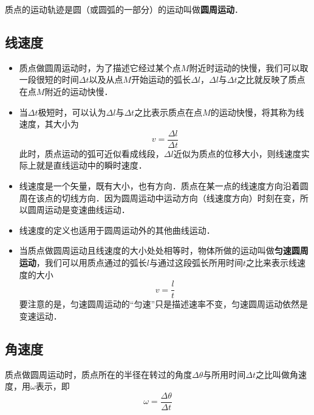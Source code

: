 
质点的运动轨迹是圆（或圆弧的一部分）的运动叫做\textbf{圆周运动}．

\subsection{线速度}

\begin{itemize}
\item 质点做圆周运动时，为了描述它经过某个点$M$附近时运动的快慢，我们可以取一段很短的时间$\Delta t$以及从点$M$开始运动的弧长$\Delta l$，$\Delta l$与$\Delta t$之比就反映了质点在点$M$附近的运动快慢．

\item 当$\Delta t$极短时，可以认为$\Delta l$与$\Delta t$之比表示质点在点$M$的运动快慢，将其称为线速度，其大小为
\begin{equation}
v=\frac{\Delta l}{\Delta t}
\end{equation}
此时，质点运动的弧可近似看成线段，$\Delta l$近似为质点的位移大小，则线速度实际上就是直线运动中的瞬时速度．

\item 线速度是一个矢量，既有大小，也有方向．质点在某一点的线速度方向沿着圆周在该点的切线方向．因为圆周运动中运动方向（线速度方向）时刻在变，所以圆周运动是变速曲线运动．

\item 线速度的定义也适用于圆周运动外的其他曲线运动．

\item 当质点做圆周运动且线速度的大小处处相等时，物体所做的运动叫做\textbf{匀速圆周运动}，我们可以用质点通过的弧长$l$与通过这段弧长所用时间$t$之比来表示线速度的大小
\begin{equation}
v=\frac{l}{t}
\end{equation}
要注意的是，匀速圆周运动的“匀速”只是描述速率不变，匀速圆周运动依然是变速运动．
\end{itemize}

\subsection{角速度}

质点做圆周运动时，质点所在的半径在转过的角度$\Delta \theta$与所用时间$\Delta t$之比叫做角速度，用$\omega$表示，即
\begin{equation}
\omega = \frac{\Delta \theta}{\Delta t}
\end{equation}

